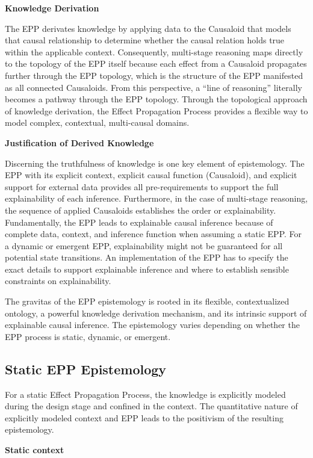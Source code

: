 \textbf{Knowledge Derivation}

The EPP derivates knowledge by applying data to the Causaloid that models that causal relationship to determine whether the causal relation holds true within the applicable context. Consequently, multi-stage reasoning maps directly to the topology of the EPP itself because each effect from a Causaloid propagates further through the EPP topology, which is the structure of the EPP manifested as all connected Causaloids.
From this perspective, a “line of reasoning” literally becomes a pathway through the EPP topology.
Through the topological approach of knowledge derivation, the Effect Propagation Process provides a flexible way to model complex, contextual, multi-causal domains.

\textbf{Justification of Derived Knowledge}

Discerning the truthfulness of knowledge is one key element of epistemology. The EPP with its explicit context, explicit causal function (Causaloid), and explicit support for external data provides all pre-requirements to support the full explainability of each inference. Furthermore, in the case of multi-stage reasoning, the sequence of applied Causaloids establishes the order or explainability.
Fundamentally, the EPP leads to explainable causal inference because of complete data, context, and inference function when assuming a static EPP. For a dynamic or emergent EPP, explainability might not be guaranteed for all potential state transitions. An implementation of the EPP has to specify the exact details to support explainable inference and where to establish sensible constraints on explainability.

The gravitas of the EPP epistemology is rooted in its flexible, contextualized ontology, a powerful knowledge derivation mechanism, and its intrinsic support of explainable causal inference. The epistemology varies depending on whether the EPP process is static, dynamic, or emergent.

\subsection{Static EPP Epistemology}

For a static Effect Propagation Process, the knowledge is explicitly modeled during the design stage and confined in the context. The quantitative nature of explicitly modeled context and EPP leads to the positivism of the resulting epistemology.

\textbf{Static context}


